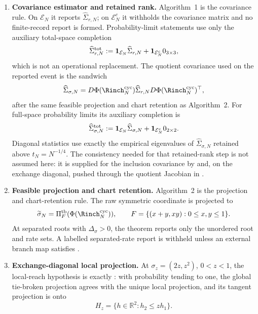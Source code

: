 \begin{assumption}
\begin{enumerate}[label=\textup{FR-\arabic*.},ref=FR-\arabic*,leftmargin=3.0em,itemsep=0.45em]
\item\label{fr:covariance-main}\textbf{Covariance estimator and retained rank.}
Algorithm~1 is the covariance rule.  On \(\mathcal E_N\) it reports
\(\widehat\Sigma_{r,N}\); on \(\mathcal E_N^c\) it withholds the covariance
matrix and no finite-record report is formed.  Probability-limit statements use only
the auxiliary total-space completion
\[
\widehat\Sigma_{r,N}^{\rm tot}
:=\mathbf 1_{\mathcal E_N}\widehat\Sigma_{r,N}
+\mathbf 1_{\mathcal E_N^c}0_{3\times3},
\]
which is not an operational replacement.  The quotient covariance used on the
reported event is the sandwich
\[
\widehat\Sigma_{\sigma,N}
=D\Phi(\Rinch_N^{\mathrm{cyc}})
 \widehat\Sigma_{r,N}
 D\Phi(\Rinch_N^{\mathrm{cyc}})^\top,
\]
after the same feasible projection and chart retention as Algorithm~2.
For full-space probability limits its auxiliary completion is
\[
\widehat\Sigma_{\sigma,N}^{\rm tot}
:=\mathbf 1_{\mathcal E_N}\widehat\Sigma_{\sigma,N}
+\mathbf 1_{\mathcal E_N^c}0_{2\times2}.
\]
Diagonal statistics use exactly the empirical eigenvalues of
\(\widehat\Sigma_{\sigma,N}\) retained above \(t_N=N^{-1/4}\).  The consistency
needed for that retained-rank step is not assumed here: it is supplied for
the inclusion covariance by  and, on
the exchange diagonal, pushed through the quotient Jacobian in
.

\item\label{fr:projection-main}\textbf{Feasible projection and chart retention.}
Algorithm~2 is the projection and chart-retention rule.  The raw symmetric
coordinate is projected to
\[
\widetilde\sigma_N=\Pi_F^{\rm tb}(\Phi(\Rinch_N^{\mathrm{cyc}})),
\qquad
F=\{(x+y,xy):0\le x,y\le1\}.
\]
At separated roots with \(\Delta_\sigma>0\), the theorem reports only the
unordered root and rate sets.  A labelled separated-rate report is withheld
unless an external branch map satisfies
.

\item\label{fr:diagonal-main}\textbf{Exchange-diagonal local projection.}
At \(\sigma_z=(2z,z^2)\), \(0<z<1\), the local-reach hypothesis is exactly
: with probability tending
to one, the global tie-broken projection agrees with the unique local
projection, and its tangent projection is onto
\[
H_z=\{h\in\mathbb R^2:h_2\le zh_1\}.
\]


\end{enumerate}
\end{assumption}
